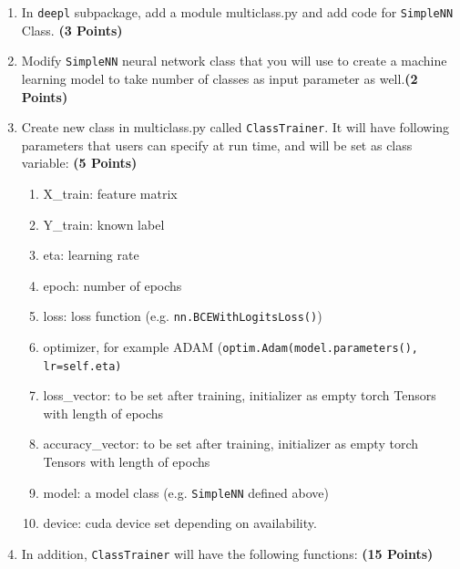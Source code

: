 \documentclass[12pt, xcolor=dvipsnames,svgnames,x11names]{article}
\begin{document}
\begin{enumerate}

\item In \texttt{deepl} subpackage, add a module multiclass.py and add code for \texttt{SimpleNN} Class. \hfill \textbf{(3 Points)}

\item Modify \texttt{SimpleNN} neural network class that you will use to create a machine learning model to take number of classes as input parameter as well.\hfill \textbf{(2 Points)}

\item Create new class in multiclass.py called \texttt{ClassTrainer}. It will have following parameters that users can specify at run time, and will be set as class variable: \hfill \textbf{(5 Points)}

\begin{enumerate}
\item X\_train: feature matrix
\item Y\_train: known label
\item eta: learning rate
\item epoch: number of epochs
\item loss: loss function (e.g. \texttt{nn.BCEWithLogitsLoss()})
\item optimizer, for example ADAM (\texttt{optim.Adam(model.parameters(), lr=self.eta)}
\item loss\_vector: to be set after training, initializer as empty torch Tensors with length of epochs
\item accuracy\_vector: to be set after training, initializer as empty torch Tensors with length of epochs
\item model: a model class (e.g. \texttt{SimpleNN} defined above)
\item device: cuda device set depending on availability.
\end{enumerate}

\item In addition, \texttt{ClassTrainer} will have the following functions: \hfill \textbf{(15 Points)}


\end{enumerate}
\end{document}
